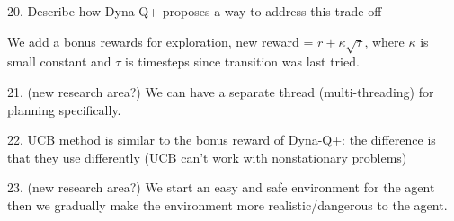 \documentclass[sutton_barto_notes.tex]{subfiles}
\begin{document}
20. Describe how Dyna-Q+ proposes a way to address this trade-off

We add a bonus rewards for exploration, new reward = $r + \kappa\sqrt{\tau}$, where $\kappa$ is small constant and $\tau$ is timesteps since transition was last tried.

21. (new research area?) We can have a separate thread (multi-threading) for planning specifically.

22. UCB method is similar to the bonus reward of Dyna-Q+: the difference is that they use differently (UCB can't work with nonstationary problems)

23. (new research area?) We start an easy and safe environment for the agent then we gradually make the environment more realistic/dangerous to the agent.
\end{document}
